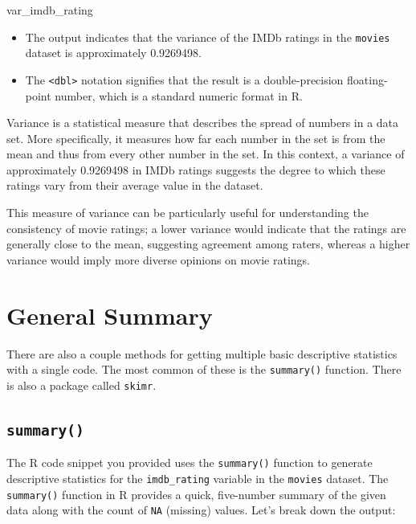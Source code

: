 \documentclass[
]{book}
\newenvironment{Shaded}{\begin{snugshade}}{\end{snugshade}}
\newcommand{\NormalTok}[1]{#1}
\providecommand{\tightlist}{%
  \setlength{\itemsep}{0pt}\setlength{\parskip}{0pt}}
\begin{document}
\begin{Shaded}
\begin{Highlighting}[]
\NormalTok{var\_imdb\_rating}
\end{Highlighting}
\end{Shaded}

\begin{itemize}
\tightlist
\item
  The output indicates that the variance of the IMDb ratings in the \texttt{movies} dataset is approximately 0.9269498.
\item
  The \texttt{\textless{}dbl\textgreater{}} notation signifies that the result is a double-precision floating-point number, which is a standard numeric format in R.
\end{itemize}

Variance is a statistical measure that describes the spread of numbers in a data set. More specifically, it measures how far each number in the set is from the mean and thus from every other number in the set. In this context, a variance of approximately 0.9269498 in IMDb ratings suggests the degree to which these ratings vary from their average value in the dataset.

This measure of variance can be particularly useful for understanding the consistency of movie ratings; a lower variance would indicate that the ratings are generally close to the mean, suggesting agreement among raters, whereas a higher variance would imply more diverse opinions on movie ratings.

\section{General Summary}\label{general-summary}

There are also a couple methods for getting multiple basic descriptive statistics with a single code. The most common of these is the \texttt{summary()} function. There is also a package called \texttt{skimr}.

\subsection*{\texorpdfstring{\texttt{summary()}}{summary()}}\label{summary}

The R code snippet you provided uses the \texttt{summary()} function to generate descriptive statistics for the \texttt{imdb\_rating} variable in the \texttt{movies} dataset. The \texttt{summary()} function in R provides a quick, five-number summary of the given data along with the count of \texttt{NA} (missing) values. Let's break down the output:
\end{document}
